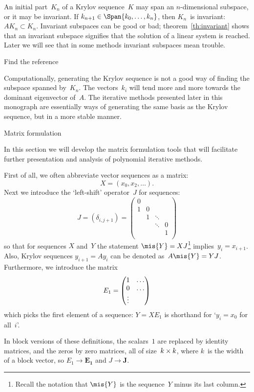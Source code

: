 An initial part~$K_n$ of a Krylov sequence~$K$ may span an
$n$-dimensional subspace, or it may be invariant. If
$k_{n+1}\in\Span{k_0,\ldots,k_n}$, then $K_n$~is invariant:
$AK_n\subset K_n$. Invariant subspaces can be good or bad;
theorem~\ref{th:invariant} shows that an invariant subspace signifies
that the solution of a linear system is reached. Later we will see
that in some methods invariant subspaces mean trouble.
\begin{question}
Find the reference
\end{question}

Computationally, generating the Krylov sequence is not a good way of
finding the subspace spanned by~$K_n$. The vectors~$k_i$ will tend more and
more towards the dominant eigenvector of~$A$. The iterative
methods presented later in this monograph are essentially ways of
generating the same basis as the Krylov sequence, but in a more stable manner.

 {Matrix formulation}
\label{sec:matrix-form}

In this section we will develop the matrix formulation tools 
that will facilitate
further presentation and analysis of polynomial iterative methods.

First of all, we  often abbreviate vector sequences as a matrix:
\[ X=(x_0,x_2,\ldots). \]
Next we introduce
the `left-shift' operator~$J$ for sequences:
\[
  J=(\delta_{i,j+1})=
  \begin{pmatrix}0\\ 1&0\\ &1&\ddots\\ &&\ddots&0\\
    &&&1\\
  \end{pmatrix} 
\]
so that for sequences $X$ and~$Y$ the statement
$\mis{Y}=XJ$\footnote{Recall the notation that $\mis{Y}$ is the
  sequence~$Y$ minus its last column.} implies~$y_i=x_{i+1}$. Also,
Krylov sequences $y_{i+1}=Ay_i$ can be denoted
as~$A\mis{Y}=YJ$. Furthermore, we introduce the matrix
        \[ E_1=\begin{pmatrix}1&\ldots\cr 0&\ldots\cr \vdots\cr\end{pmatrix} \]
which picks the first element of a sequence: $Y=XE_1$ is shorthand for
`$y_i=x_0$ for all~$i$'.

\begin{block}
In block versions of these definitions, the scalars~$1$ are
replaced by identity matrices, and the zeros by zero matrices,
all of size~$k\times\nobreak k$, where $k$~is the width of a block vector,
so $E_1\rightarrow \bm{E_1}$ and $J\rightarrow \bm{J}$.
\end{block}

